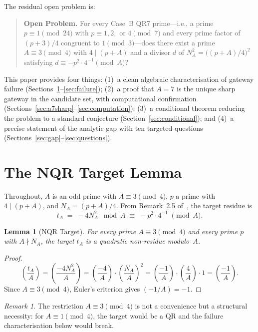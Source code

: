 \documentclass[12pt]{amsart}
\newtheorem{lemma}[theorem]{Lemma}
\theoremstyle{definition}
\theoremstyle{remark}
\newtheorem{remark}[theorem]{Remark}
\newcommand{\leg}[2]{\left(\frac{#1}{#2}\right)}
\begin{document}
The residual open problem is:

\begin{quote}
\textbf{Open Problem.}
For every Case~B QR7 prime---i.e., a prime $p \equiv 1 \pmod{24}$ with
$p \equiv 1, 2,$ or $4 \pmod{7}$ and every prime factor of $(p+3)/4$
congruent to $1 \pmod{3}$---does there exist a prime $A \equiv 3 \pmod{4}$
with $4 \mid (p+A)$ and a divisor $d$ of $N_A^2 = \bigl((p+A)/4\bigr)^2$
satisfying $d \equiv -p^2 \cdot 4^{-1} \pmod{A}$?
\end{quote}

This paper provides four things: (1)~a clean algebraic characterisation of
gateway failure (Sections~\ref{sec:nqr}--\ref{sec:failure});
(2)~a proof that $A = 7$ is the unique sharp gateway in the candidate set,
with computational confirmation (Sections~\ref{sec:a7sharp}--\ref{sec:computation});
(3)~a conditional theorem reducing the problem to a standard conjecture
(Section~\ref{sec:conditional});
and (4)~a precise statement of the analytic gap with ten targeted questions
(Sections~\ref{sec:gap}--\ref{sec:questions}).

\section{The NQR Target Lemma}\label{sec:nqr}

Throughout, $A$ is an odd prime with $A \equiv 3 \pmod{4}$,
$p$ a prime with $4 \mid (p+A)$, and $N_A = (p+A)/4$.
From Remark~2.5 of~\cite{Gateway2026}, the target residue is
\[
  t_A \;=\; -4N_A^2 \;\bmod A
  \;\equiv\; -p^2 \cdot 4^{-1} \;\pmod{A}.
\]

\begin{lemma}[NQR Target]\label{lem:nqr-target}
For every prime $A \equiv 3 \pmod{4}$ and every prime $p$ with $A \nmid N_A$,
the target $t_A$ is a \emph{quadratic non-residue} modulo~$A$.
\end{lemma}

\begin{proof}
\[
  \leg{t_A}{A}
  = \leg{-4N_A^2}{A}
  = \leg{-4}{A}\cdot\leg{N_A}{A}^2
  = \leg{-1}{A}\cdot\leg{4}{A}\cdot 1
  = \leg{-1}{A}.
\]
Since $A \equiv 3 \pmod{4}$, Euler's criterion gives $(-1/A) = -1$.
\end{proof}

\begin{remark}
The restriction $A \equiv 3 \pmod{4}$ is not a convenience but a structural
necessity: for $A \equiv 1 \pmod{4}$, the target would be a QR and the
failure characterisation below would break.
\end{remark}
\end{document}
